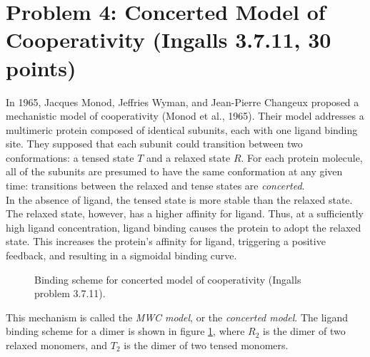 \documentclass{article}
\begin{document}
\section*{Problem 4: Concerted Model of Cooperativity (Ingalls 3.7.11, 30 points)}

In 1965, Jacques Monod, Jeffries Wyman, and Jean-Pierre Changeux proposed a mechanistic model of cooperativity (Monod et al., 1965). Their model addresses a multimeric protein composed of identical subunits, each with one ligand binding site. They supposed that each subunit could transition between two conformations: a tensed state $T$ and a relaxed state $R$. For each protein molecule, all of the subunits are presumed to have the same conformation at any given time: transitions between the relaxed and tense states are \textit{concerted}.\\

In the absence of ligand, the tensed state is more stable than the relaxed state. The relaxed state, however, has a higher affinity for ligand. Thus, at a sufficiently high ligand concentration, ligand binding causes the protein to adopt the relaxed state. This increases the protein's affinity for ligand, triggering a positive feedback, and resulting in a sigmoidal binding curve.

\begin{figure}[htp] 
\caption{Binding scheme for concerted model of cooperativity (Ingalls problem 3.7.11).} \label{fig:ingallsmwc}
\end{figure}  

This mechanism is called the \textit{MWC model}, or the \textit{concerted model}. The ligand binding scheme for a dimer is shown in figure \ref{fig:ingallsmwc}, where $R_2$ is the dimer of two relaxed monomers, and $T_2$ is the dimer of two tensed monomers.
\end{document}
